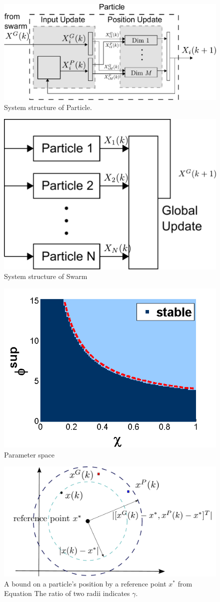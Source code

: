 \documentclass[phd]{byuprop}
\begin{document}
\begin{figure}
\centering
\includegraphics[width=0.7\linewidth]{./fig/particle_sys_flow.pdf}
\caption{System structure of Particle.}
\label{fig:sys:particle}
\end{figure}

\begin{figure}
\centering
\includegraphics[width=0.5\linewidth]{./fig/pso_sys_flow.pdf}
\caption{System structure of Swarm}
\label{fig:sys:swarm}
\end{figure}

\begin{figure}
\centering
\includegraphics[width=0.5\linewidth]{./fig/param2.png}
\caption{Parameter space}
\label{fig:paramSpace}
\end{figure}

\begin{figure}
\centering
\includegraphics[width=0.6\linewidth]{./fig/boundary}
\caption{A bound on a particle's position by a reference point $ x^{*} $ from Equation %
The ratio of two radii indicates $ \gamma $.}
\label{fig:boundary}
\end{figure}
\end{document}
